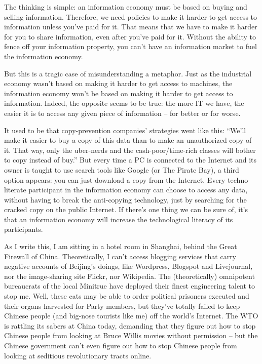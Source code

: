 The thinking is simple: an information economy must be based on
buying and selling information. Therefore, we need policies to make
it harder to get access to information unless you've paid for it.
That means that we have to make it harder for you to share
information, even after you've paid for it. Without the ability to
fence off your information property, you can't have an information
market to fuel the information economy.

But this is a tragic case of misunderstanding a metaphor. Just as
the industrial economy wasn't based on making it harder to get
access to machines, the information economy won't be based on
making it harder to get access to information. Indeed, the opposite
seems to be true: the more IT we have, the easier it is to access
any given piece of information -- for better or for worse.

It used to be that copy-prevention companies' strategies went like
this: ``We'll make it easier to buy a copy of this data than to make
an unauthorized copy of it. That way, only the uber-nerds and the
cash-poor/time-rich classes will bother to copy instead of buy.''
But every time a PC is connected to the Internet and its owner is
taught to use search tools like Google (or The Pirate Bay), a third
option appears: you can just download a copy from the Internet.
Every techno-literate participant in the information economy can
choose to access any data, without having to break the anti-copying
technology, just by searching for the cracked copy on the public
Internet. If there's one thing we can be sure of, it's that an
information economy will increase the technological literacy of its
participants.

As I write this, I am sitting in a hotel room in Shanghai, behind
the Great Firewall of China. Theoretically, I can't access blogging
services that carry negative accounts of Beijing's doings, like
Wordpress, Blogspot and Livejournal, nor the image-sharing site
Flickr, nor Wikipedia. The (theoretically) omnipotent bureaucrats
of the local Minitrue have deployed their finest engineering talent
to stop me. Well, these cats may be able to order political
prisoners executed and their organs harvested for Party members,
but they've totally failed to keep Chinese people (and big-nose
tourists like me) off the world's Internet. The WTO is rattling its
sabers at China today, demanding that they figure out how to stop
Chinese people from looking at Bruce Willis movies without
permission -- but the Chinese government can't even figure out how
to stop Chinese people from looking at seditious revolutionary
tracts online.

